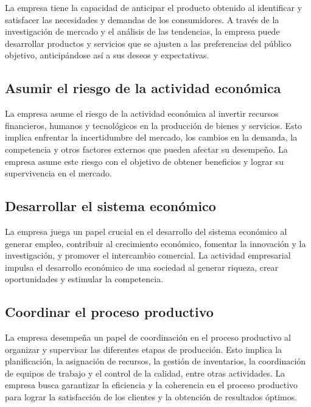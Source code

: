 \documentclass[
  letterpaper,
  DIV=11,
  numbers=noendperiod]{scrartcl}
\begin{document}
La empresa tiene la capacidad de anticipar el producto obtenido al
identificar y satisfacer las necesidades y demandas de los consumidores.
A través de la investigación de mercado y el análisis de las tendencias,
la empresa puede desarrollar productos y servicios que se ajusten a las
preferencias del público objetivo, anticipándose así a sus deseos y
expectativas.

\hypertarget{asumir-el-riesgo-de-la-actividad-econuxf3mica}{%
\subsection{Asumir el riesgo de la actividad
económica}\label{asumir-el-riesgo-de-la-actividad-econuxf3mica}}

La empresa asume el riesgo de la actividad económica al invertir
recursos financieros, humanos y tecnológicos en la producción de bienes
y servicios. Esto implica enfrentar la incertidumbre del mercado, los
cambios en la demanda, la competencia y otros factores externos que
pueden afectar su desempeño. La empresa asume este riesgo con el
objetivo de obtener beneficios y lograr su supervivencia en el mercado.

\hypertarget{desarrollar-el-sistema-econuxf3mico}{%
\subsection{Desarrollar el sistema
económico}\label{desarrollar-el-sistema-econuxf3mico}}

La empresa juega un papel crucial en el desarrollo del sistema económico
al generar empleo, contribuir al crecimiento económico, fomentar la
innovación y la investigación, y promover el intercambio comercial. La
actividad empresarial impulsa el desarrollo económico de una sociedad al
generar riqueza, crear oportunidades y estimular la competencia.

\hypertarget{coordinar-el-proceso-productivo}{%
\subsection{Coordinar el proceso
productivo}\label{coordinar-el-proceso-productivo}}

La empresa desempeña un papel de coordinación en el proceso productivo
al organizar y supervisar las diferentes etapas de producción. Esto
implica la planificación, la asignación de recursos, la gestión de
inventarios, la coordinación de equipos de trabajo y el control de la
calidad, entre otras actividades. La empresa busca garantizar la
eficiencia y la coherencia en el proceso productivo para lograr la
satisfacción de los clientes y la obtención de resultados óptimos.
\end{document}
